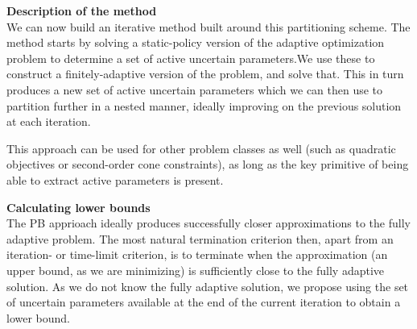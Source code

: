 \textbf{Description of the method}\\

We can now build an iterative method built around this partitioning scheme. The method starts by solving a static-policy version of the adaptive optimization problem to determine a set of active uncertain parameters.We use these to construct a finitely-adaptive version of the problem, and solve that. This in turn produces a new set of active uncertain parameters which we can then use to partition further in a nested manner, ideally improving on the previous solution at each iteration.

This approach can be used for other problem classes as well (such as quadratic objectives or second-order cone constraints), as long as the key primitive of being able to extract active parameters is present.

\textbf{Calculating lower bounds}\\

The PB apprioach ideally produces successfully closer approximations to the fully adaptive problem. The most natural termination criterion then, apart from an iteration- or time-limit criterion, is to terminate when the approximation (an upper bound, as we are minimizing) is sufficiently close to the fully adaptive solution. As we do not know the fully adaptive solution, we propose using the set of uncertain parameters available at the end of the current iteration to obtain a lower bound.
